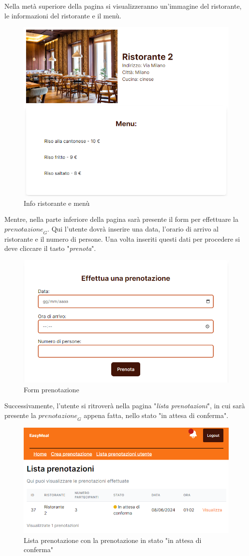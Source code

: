 Nella metà superiore della pagina si visualizzeranno un'immagine del ristorante, le informazioni del ristorante e il menù.
\begin{figure}[H]
    \centering
    \includegraphics[width=0.6\linewidth]{img/prenotazione_info.png}
    \caption{Info ristorante e menù}
    \label{fig:prenotazione_info}
\end{figure}
Mentre, nella parte inferiore della pagina sarà presente il form per effettuare la $\textit{prenotazione}_G$. Qui l'utente dovrà inserire una data, l'orario di arrivo al ristorante e il numero di persone. Una volta inseriti questi dati per procedere si deve cliccare il tasto "\emph{prenota}".
\begin{figure}[H]
    \centering
    \includegraphics[width=0.6\linewidth]{img/prenotazione_form.png}
    \caption{Form prenotazione}
    \label{fig:prenotazione_form}
\end{figure}
Successivamente, l'utente si ritroverà nella pagina "\emph{lista prenotazioni}", in cui sarà presente la $\textit{prenotazione}_G$ appena fatta, nello stato "in attesa di conferma".
\begin{figure}[H]
    \centering
    \includegraphics[width=0.6\linewidth]{img/lista_prenotazioni_post_prenotazione.png}
    \caption{Lista prenotazione con la prenotazione in stato "in attesa di conferma"}
    \label{fig:lista_prenotazioni_post_prenotazione}
\end{figure}

